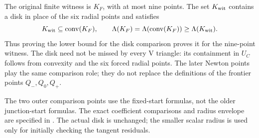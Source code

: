 The original finite witness is $K_F$, with at most nine points. The set
$K_{\rm wit}$ contains a disk in place of the six radial points and satisfies
\[
 K_{\rm wit}\subseteq\mathrm{conv}(K_F),\qquad
 \Lambda(K_F)=\Lambda(\mathrm{conv}(K_F))\ge\Lambda(K_{\rm wit}).
\]
Thus proving the lower bound for the disk comparison proves it for the
nine-point witness. The disk need not be missed by every V triangle:
its containment in $U_C$ follows from convexity and the six forced radial
points. The later Newton points play the same comparison role; they do not
replace the definitions of the frontier points $Q_-,Q_0,Q_+$.

The two outer comparison points use the fixed-start formulas, not the older
junction-start formulas. The exact coefficient comparisons and radius envelope
are specified in .
The actual disk is unchanged; the smaller scalar radius is used only for
initially checking the tangent residuals.
